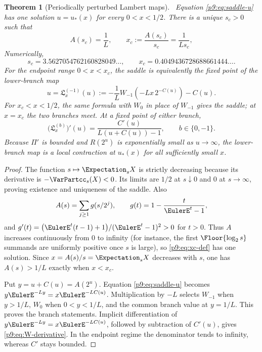 \documentclass[11pt]{article}
\numberwithin{equation}{section}
\newtheorem{theorem}{Theorem}[section]
\theoremstyle{definition}
\theoremstyle{remark}
\begin{document}
\begin{theorem}[Periodically perturbed Lambert maps]\label{p9:thm:periodic-W}
\statusN\ Equation \eqref{p9:eq:saddle-u} has one solution $u=u_*(x)$ for every
$0<x<1/2$.  There is a unique $s_c>0$ such that
\begin{equation}
 A(s_c)=\frac1L,
 \qquad
 x_c:=\frac{A(s_c)}{s_c}=\frac1{Ls_c},                    \label{p9:eq:xc-def}
\end{equation}
Numerically,
\begin{equation}
 s_c=3.5627054762160828049\ldots,
 \qquad x_c=0.4049436728688661444\ldots.                  \label{p9:eq:xc-num}
\end{equation}
For the endpoint range $0<x<x_c$, the saddle is equivalently the fixed point of the
lower-branch map
\begin{equation}
 \boxed{
 u=\mathfrak L_x^{(-1)}(u):=-\frac1L
 W_{-1}\!\left(-Lx\,2^{-C(u)}\right)-C(u).}                \label{p9:eq:W-map}
\end{equation}
For $x_c<x<1/2$, the same formula with $W_0$ in place of $W_{-1}$ gives the saddle; at
$x=x_c$ the two branches meet.  At a fixed point of either branch,
\begin{equation}
 \boxed{
 \bigl(\mathfrak L_x^{(b)}\bigr)'(u)
 =\frac{C'(u)}{L(u+C(u))-1},\qquad b\in\{0,-1\}.}          \label{p9:eq:W-derivative}
\end{equation}
Because $\Pi'$ is bounded and $R(2^u)$ is exponentially small as $u\to\infty$, the
lower-branch map is a local contraction at $u_*(x)$ for all sufficiently small $x$.
\end{theorem}

\begin{proof}
The function $s\mapsto\Expectation_sX$ is strictly decreasing because its derivative is
$-\VarPartcc_s(X)<0$.  Its limits are $1/2$ at $s\downarrow0$ and $0$ at $s\to\infty$, proving
existence and uniqueness of the saddle.  Also
\[
 A(s)=\sum_{j\ge1}g(s/2^j),\qquad
 g(t)=1-\frac{t}{\EulerE^t-1},
\]
and
$g'(t)=\bigl(\EulerE^t(t-1)+1\bigr)/(\EulerE^t-1)^2>0$ for $t>0$.
Thus $A$ increases continuously from $0$ to infinity (for instance, the first
$\Floor{\log_2s}$ summands are uniformly positive once $s$ is large), so
\eqref{p9:eq:xc-def} has one solution.  Since $x=A(s)/s=\Expectation_sX$ decreases with $s$, one has
$A(s)>1/L$ exactly when $x<x_c$.

Put $y=u+C(u)=A(2^u)$.  Equation \eqref{p9:eq:saddle-u} becomes
$y\EulerE^{-Ly}=x\EulerE^{-LC(u)}$.  Multiplication by $-L$ selects $W_{-1}$ when
$y>1/L$, $W_0$ when $0<y<1/L$, and the common branch value at $y=1/L$.  This proves the
branch statements.  Implicit differentiation of
$y\EulerE^{-Ly}=x\EulerE^{-LC(u)}$, followed by subtraction of $C'(u)$, gives
\eqref{p9:eq:W-derivative}.  In the endpoint regime the denominator tends to infinity,
whereas $C'$ stays bounded.
\end{proof}
\end{document}
